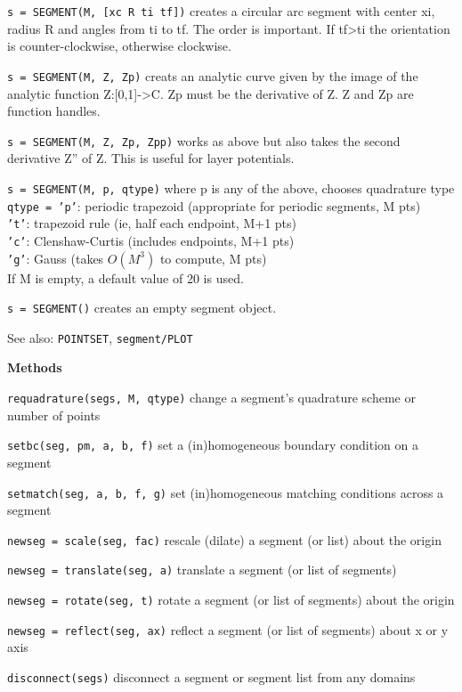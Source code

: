 {\tt s = SEGMENT(M, [xc R ti tf])} creates a circular arc segment with center
xi, radius R and angles from ti to tf. The order is important. If tf>ti
the orientation is counter-clockwise, otherwise clockwise.
  
{\tt s = SEGMENT(M, {Z, Zp})} creats an analytic curve given by the image of 
the analytic function Z:[0,1]->C. Zp must be the derivative of Z. 
Z and Zp are function handles. 
  
{\tt s = SEGMENT(M, {Z, Zp, Zpp})} works as above but also takes the second
derivative Z'' of Z. This is useful for layer potentials.
 
{\tt s = SEGMENT(M, p, qtype)} where p is any of the above, chooses quadrature type\\
    {\tt qtype = 'p'}: periodic trapezoid (appropriate for periodic segments, M pts)\\
          {\tt 't'}: trapezoid rule (ie, half each endpoint, M+1 pts)\\
           {\tt 'c'}: Clenshaw-Curtis (includes endpoints, M+1 pts)\\
           {\tt 'g'}: Gauss (takes $O(M^3)$ to compute, M pts)\\

If M is empty, a default value of 20 is used.

{\tt s = SEGMENT()} creates an empty segment object.

See also: {\tt POINTSET}, {\tt segment/PLOT}

\textbf{Methods}

{\tt requadrature(segs, M, qtype)} change a segment's quadrature
scheme or number of points

{\tt setbc(seg, pm, a, b, f)} set a (in)homogeneous boundary
condition on a segment

{\tt setmatch(seg, a, b, f, g)} set (in)homogeneous matching
conditions across a segment 

{\tt newseg = scale(seg, fac)} rescale (dilate) a segment (or list)
about the origin

{\tt newseg = translate(seg, a)} translate a segment (or list of segments)

{\tt newseg = rotate(seg, t)} rotate a segment (or list of
segments) about the origin

{\tt newseg = reflect(seg, ax)} reflect a segment (or list of
segments) about x or y axis

{\tt disconnect(segs)} disconnect a segment or segment list from any domains

